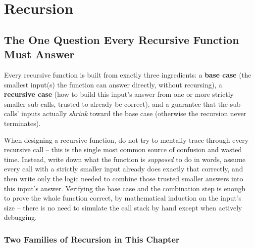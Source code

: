 \chapter{Recursion}

\section{The One Question Every Recursive Function Must Answer}
\label{sec:rec-intro}

Every recursive function is built from exactly three ingredients: a
\textbf{base case} (the smallest input(s) the function can answer
directly, without recursing), a \textbf{recursive case} (how to build
this input's answer from one or more strictly smaller sub-calls, trusted
to already be correct), and a guarantee that the sub-calls' inputs
actually \emph{shrink} toward the base case (otherwise the recursion
never terminates).

\begin{ideabox}
When designing a recursive function, do not try to mentally trace through
every recursive call -- this is the single most common source of
confusion and wasted time. Instead, write down what the function is
\emph{supposed} to do in words, assume every call with a strictly smaller
input already does exactly that correctly, and then write only the logic
needed to combine those trusted smaller answers into this input's answer.
Verifying the base case and the combination step is enough to prove the
whole function correct, by mathematical induction on the input's size --
there is no need to simulate the call stack by hand except when actively
debugging.
\end{ideabox}

\subsection*{Two Families of Recursion in This Chapter}

